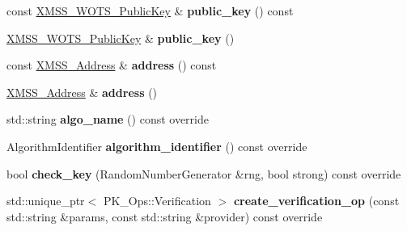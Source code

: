 \begin{DoxyCompactItemize}
const \mbox{\hyperlink{class_botan_1_1_x_m_s_s___w_o_t_s___public_key}{X\+M\+S\+S\+\_\+\+W\+O\+T\+S\+\_\+\+Public\+Key}} \& {\bfseries public\+\_\+key} () const
\item 
\mbox{\label{class_botan_1_1_x_m_s_s___w_o_t_s___addressed___public_key_a6b5da4043262be85f9a197c904fe06dd}} 
\mbox{\hyperlink{class_botan_1_1_x_m_s_s___w_o_t_s___public_key}{X\+M\+S\+S\+\_\+\+W\+O\+T\+S\+\_\+\+Public\+Key}} \& {\bfseries public\+\_\+key} ()
\item 
\mbox{\label{class_botan_1_1_x_m_s_s___w_o_t_s___addressed___public_key_a202346ce4ac83b0e0b48428433b2e018}} 
const \mbox{\hyperlink{class_botan_1_1_x_m_s_s___address}{X\+M\+S\+S\+\_\+\+Address}} \& {\bfseries address} () const
\item 
\mbox{\label{class_botan_1_1_x_m_s_s___w_o_t_s___addressed___public_key_ab10f3611e85f70c48ee4c1b5fd1b16d5}} 
\mbox{\hyperlink{class_botan_1_1_x_m_s_s___address}{X\+M\+S\+S\+\_\+\+Address}} \& {\bfseries address} ()
\item 
\mbox{\label{class_botan_1_1_x_m_s_s___w_o_t_s___addressed___public_key_a5ccbe1ff8b976bc91ccab2855c740856}} 
std\+::string {\bfseries algo\+\_\+name} () const override
\item 
\mbox{\label{class_botan_1_1_x_m_s_s___w_o_t_s___addressed___public_key_a82ae3d07e4a4a7d9184dd96acbb6f6a5}} 
Algorithm\+Identifier {\bfseries algorithm\+\_\+identifier} () const override
\item 
\mbox{\label{class_botan_1_1_x_m_s_s___w_o_t_s___addressed___public_key_a7a9665eb0a927fe39faeca17bfdb2e49}} 
bool {\bfseries check\+\_\+key} (Random\+Number\+Generator \&rng, bool strong) const override
\item 
\mbox{\label{class_botan_1_1_x_m_s_s___w_o_t_s___addressed___public_key_a2275d6bb35d15f05f466b381605e912d}} 
std\+::unique\+\_\+ptr$<$ P\+K\+\_\+\+Ops\+::\+Verification $>$ {\bfseries create\+\_\+verification\+\_\+op} (const std\+::string \&params, const std\+::string \&provider) const override

\end{DoxyCompactItemize}
